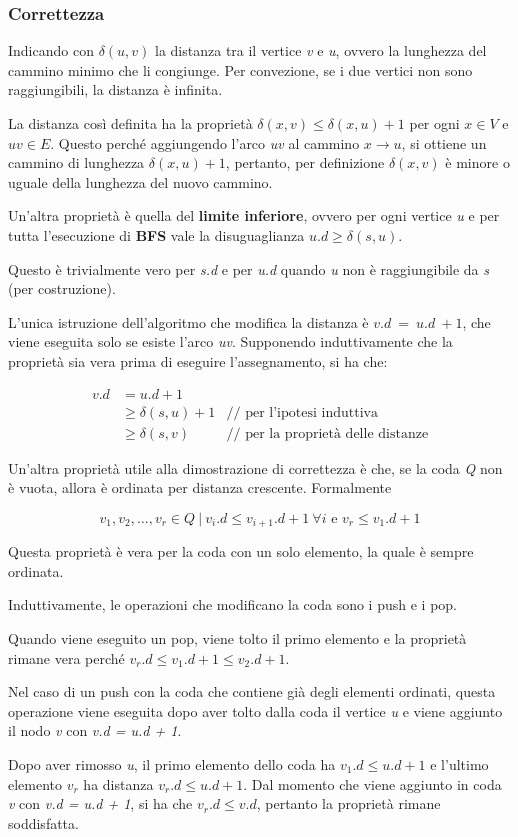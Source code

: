 \subsubsection{Correttezza}\label{correttezza}

Indicando con $\delta(u,v)$ la distanza tra il vertice \emph{v} e
\emph{u}, ovvero la lunghezza del cammino minimo che li congiunge. Per
convezione, se i due vertici non sono raggiungibili, la distanza è
infinita.

La distanza così definita ha la proprietà $\delta(x,v) \leq \delta(x,u) + 1$ per ogni $x \in V$ e $uv \in E$. 
Questo perché aggiungendo l'arco \emph{uv} al cammino $ x \rightarrow u$, si ottiene un cammino di
lunghezza $\delta(x,u) + 1$, pertanto, per definizione $\delta(x,v)$ è
minore o uguale della lunghezza del nuovo cammino.

Un'altra proprietà è quella del \textbf{limite inferiore}, ovvero per
ogni vertice \emph{u} e per tutta l'esecuzione di \textbf{BFS} vale la
disuguaglianza $u.d \geq \delta(s,u)$.

Questo è trivialmente vero per \emph{s.d} e per \emph{u.d} quando \emph{u} non è raggiungibile da \emph{s} (per costruzione).

L'unica istruzione dell'algoritmo che modifica la distanza è
$v.d\ =\ u.d\ + 1$, che viene eseguita solo se esiste l'arco
\emph{uv}. Supponendo induttivamente che la proprietà sia vera prima di
eseguire l'assegnamento, si ha che:

\begin{align*}
v.d &= u.d + 1 &\\
     &\geq \delta(s,u) + 1 & \text{// per l'ipotesi induttiva }\\
     &\geq \delta(s,v)   & \text{// per la proprietà delle distanze}
\end{align*}

Un'altra proprietà utile alla dimostrazione di correttezza è che, se la
coda \emph{Q} non è vuota, allora è ordinata per distanza crescente.
Formalmente

$$
v_1, v_2, \ldots, v_r \in Q \: | \:  v_i.d \leq v_{i+1}.d + 1 \: \forall i  \text{ e } v_r \leq v_1.d +1
$$

Questa proprietà è vera per la coda con un solo elemento, la quale è
sempre ordinata.

Induttivamente, le operazioni che modificano la coda sono i push e i
pop.

Quando viene eseguito un pop, viene tolto il primo elemento e la
proprietà rimane vera perché $v_r.d \leq v_1.d + 1 \leq v_2.d + 1$.

Nel caso di un push con la coda che contiene già degli elementi
ordinati, questa operazione viene eseguita dopo aver tolto dalla coda il
vertice \emph{u} e viene aggiunto il nodo \emph{v} con \emph{v.d = u.d +
1}.

Dopo aver rimosso \emph{u}, il primo elemento dello coda ha  $v_1.d \leq u.d + 1$ e l'ultimo elemento $v_r$ ha distanza
$v_r.d \leq u.d +1$. Dal momento che viene aggiunto in
coda \emph{v} con \emph{v.d = u.d + 1}, si ha che $v_r.d \leq v.d$, pertanto la proprietà rimane soddisfatta.
